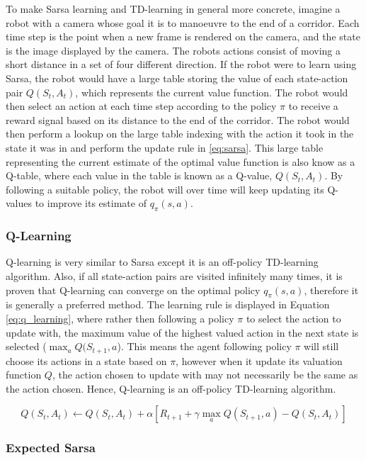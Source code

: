 \documentclass[ %
                    author={Callum Pearce},
                supervisor={Dr. Neill Campbell},
                    degree={MEng},
                     title={How effective are Temporal difference learning methods for reducing the number of zero contribution light paths, while still accurately approximating Global Illumination in Path tracing?},
                  subtitle={},
                      type={research},
                      year={2019} ]{dissertation}
\begin{document}
To make Sarsa learning and TD-learning in general more concrete, imagine a robot with a camera whose goal it is to manoeuvre to the end of a corridor. Each time step is the point when a new frame is rendered on the camera, and the state is the image displayed by the camera. The robots actions consist of moving a short distance in a set of four different direction. If the robot were to learn using Sarsa, the robot would have a large table storing the value of each state-action pair $Q(S_t, A_t)$, which represents the current value function. The robot would then select an action at each time step according to the policy $\pi$ to receive a reward signal based on its distance to the end of the corridor. The robot would then perform a lookup on the large table indexing with the action it took in the state it was in and perform the update rule in \ref{eq:sarsa}. This large table representing the current estimate of the optimal value function is also know as a Q-table, where each value in the table is known as a Q-value, $Q(S_t, A_t)$. By following a suitable policy, the robot will over time will keep updating its Q-values to improve
its estimate of $q_\pi(s,a)$.

\subsubsection{Q-Learning}

Q-learning is very similar to Sarsa except it is an off-policy TD-learning algorithm. Also, if all state-action pairs are visited infinitely many times, it is proven that Q-learning can converge on the optimal policy $q_\pi(s,a)$, therefore it is generally a preferred method. The learning rule is displayed in Equation \ref{eq:q_learning}, where rather then following a policy $\pi$ to select the action to update with, the maximum value of the highest valued action in the next state is selected ($\max_a Q(S_{t+1}, a$). This means the agent following policy $\pi$ will still choose its actions in a state based on $\pi$, however when it update its valuation function $Q$, the action chosen to update with may not necessarily be the same as the action chosen. Hence, Q-learning is an off-policy TD-learning algorithm.

\begin{equation}
Q(S_t, A_t) \leftarrow Q(S_t, A_t) + \alpha[R_{t+1} + \gamma \max_aQ(S_{t+1}, a) - Q(S_t, A_t)]
\end{equation}

\subsubsection{Expected Sarsa}
\end{document}
